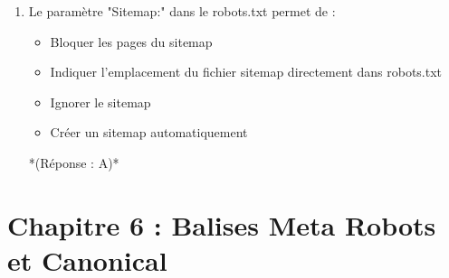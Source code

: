 \documentclass[12pt,a4paper,twoside]{report}
\begin{document}
\begin{enumerate}
\item Le paramètre "Sitemap:" dans le robots.txt permet de :
\begin{itemize}
\item[A)] Bloquer les pages du sitemap
\item[B)] Indiquer l'emplacement du fichier sitemap directement dans robots.txt
\item[C)] Ignorer le sitemap
\item[D)] Créer un sitemap automatiquement
\end{itemize}
*(Réponse : A)*
\end{enumerate}

\newpage

\section*{Chapitre 6 : Balises Meta Robots et Canonical}
\end{document}
